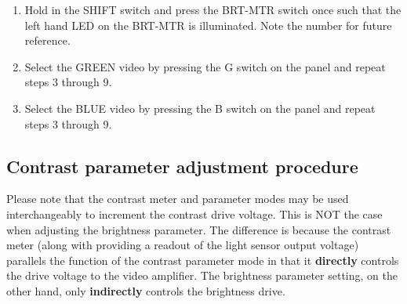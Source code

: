 \begin{enumerate}
\item Hold in the SHIFT switch and press the BRT-MTR switch once such that
the left hand LED on the BRT-MTR is illuminated. Note the number for
future reference.

\item Select the GREEN video by pressing the G switch on the panel and repeat
steps 3 through 9.                                                 

\item Select the BLUE video by pressing the B switch on the panel and repeat
steps 3 through 9.                                                 

\end{enumerate}

\subsection {\bf Contrast parameter adjustment procedure}

Please note that the contrast meter and parameter modes may be used
interchangeably to increment the contrast drive voltage. 
This is
NOT the case when adjusting the brightness parameter. The difference is
because the contrast meter (along with providing a readout of the light sensor
output voltage) parallels the function of the contrast parameter mode 
in that it {\bf directly} controls the drive voltage to the video amplifier.
The brightness parameter setting, on the other hand, only {\bf indirectly}
controls the brightness drive.

